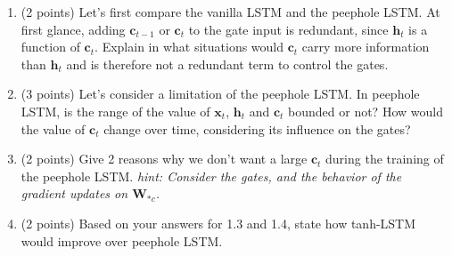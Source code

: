 \documentclass[11pt]{article}
\newcounter{QuestionCounter}
\newcounter{SubQuestionCounter}[QuestionCounter]
\newcommand{\newquestion}{\stepcounter{QuestionCounter}\setcounter{SubQuestionCounter}{1}\newpage}
\begin{document}
\begin{enumerate}[(1)]
\item (2 points) Let's first compare the vanilla LSTM and the peephole LSTM. At first glance, adding $\mathbf{c}_{t-1}$ or $\mathbf{c}_t$ to the gate input is redundant, since $\mathbf{h}_t$ is a function of $\mathbf{c}_t$. Explain in what situations would $\mathbf{c}_t$ carry more information than $\mathbf{h}_t$ and is therefore not a redundant term to control the gates.\\
\begin{answertext}{8cm}{}

\end{answertext}

\item \label{q13} (3 points) Let's consider a limitation of the peephole LSTM.
In peephole LSTM, is the range of the value of $\mathbf{x}_t$, $\mathbf{h}_t$ and $\mathbf{c}_t$ bounded or not? How would the value of $\mathbf{c}_t$ change over time, considering its influence on the gates?\\
\begin{answertext}{10cm}{}

\end{answertext}
\newpage
\item \label{q14} (2 points) Give 2 reasons why we don't want a large $\mathbf{c}_t$ during the training of the peephole LSTM. \textit{hint: Consider the gates, and the behavior of the gradient updates on $\mathbf{W}_{*c}$.}\\
\begin{answertext}{10cm}{}

\end{answertext}

\item (2 points) Based on your answers for 1.3 and 1.4, state how tanh-LSTM would improve over peephole LSTM.\\
\begin{answertext}{9cm}{}

\end{answertext}
\end{enumerate}

\newquestion
\end{document}
